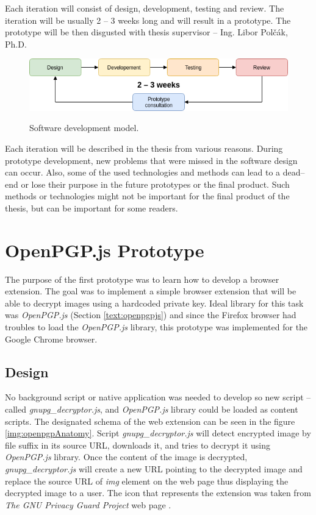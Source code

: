 Each iteration will consist of design, development, testing and review. The iteration will be usually 2 -- 3 weeks long and will result in a prototype. The prototype will be then disgusted with thesis supervisor -- Ing. Libor Polčák, Ph.D.

\begin{figure}[H]
    \begin{center}
        \label{img:extensionAnatomy}
        \includegraphics[width=1.0\textwidth]{obrazky-figures/developementModel.png}
        \caption{Software development model.}
    \end{center}
\end{figure}

Each iteration will be described in the thesis from various reasons. During prototype development, new problems that were missed in the software design can occur. Also, some of the used technologies and methods can lead to a dead--end or lose their purpose in the future prototypes or the final product. Such methods or technologies might not be important for the final product of the thesis, but can be important for some readers.

\section{OpenPGP.js Prototype}
\label{prototype:OpenPGPjs}
The purpose of the first prototype was to learn how to develop a browser extension. The goal was to implement a simple browser extension that will be able to decrypt images using a hardcoded private key. Ideal library for this task was \textit{OpenPGP.js} (Section \ref{text:openpgpjs}) and since the Firefox browser had troubles to load the \textit{OpenPGP.js} library, this prototype was implemented for the Google Chrome browser.

\subsection{Design}
No background script or native application was needed to develop so new script -- called \textit{gnupg\_decryptor.js}, and \textit{OpenPGP.js} library could be loaded as content scripts. The designated schema of the web extension can be seen in the figure \ref{img:openpgpAnatomy}. Script \textit{gnupg\_decryptor.js} will detect encrypted image by file suffix in its source URL, downloads it, and tries to decrypt it using \textit{OpenPGP.js} library. Once the content of the image is decrypted, \textit{gnupg\_decryptor.js} will create a new URL pointing to the decrypted image and replace the source URL of \textit{img} element on the web page thus displaying the decrypted image to a user. The icon that represents the extension was taken from \textit{The GNU Privacy Guard Project} web page \cite{GnuPG}.

